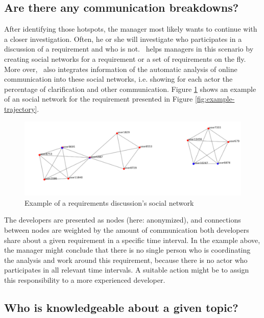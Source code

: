 \subsection{Are there any communication breakdowns?}
After identifying those hotspots, the manager most likely wants to continue with a closer investigation. 
Often, he or she will investigate who participates in a discussion of a requirement and who is not.
\viss\ helps managers in this scenario by creating social networks for a requirement or a set of requirements on the fly.
More over, \viss\ also integrates information of the automatic analysis of online communication into these social networks, i.e. showing for each actor the percentage of clarification and other communication.
Figure \ref{fig:example-sn} shows an example of an social network for the requirement presented in Figure \ref{fig:example-trajectory}. 
\begin{figure}
\includegraphics[width=\columnwidth]{img/example-sn}
\caption{Example of a requirements discussion's social network}
\label{fig:example-sn}
\end{figure}
The developers are presented as nodes (here: anonymized), and connections between nodes are weighted by the amount of communication both developers share about a given requirement in a specific time interval. 
In the example above, the manager might conclude that there is no single person who is coordinating the analysis and work around this requirement, because there is no actor who participates in all relevant time intervals.
A suitable action might be to assign this responsibility to a more experienced developer.

\subsection{Who is knowledgeable about a given topic?}

